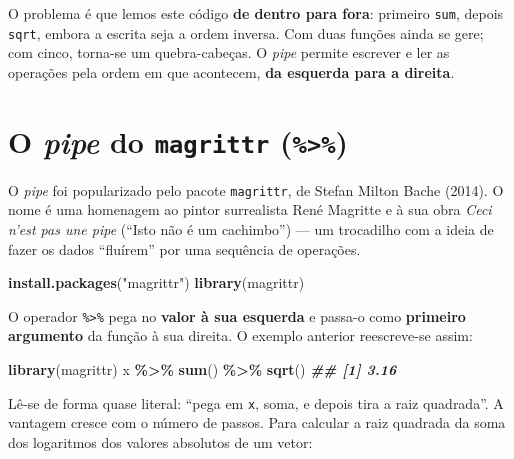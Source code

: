 \documentclass[
  portuguese,
  11pt,
  openany]{book}
\newenvironment{Shaded}{\begin{snugshade}}{\end{snugshade}}
\newcommand{\DocumentationTok}[1]{\textcolor[rgb]{0.56,0.35,0.01}{\textbf{\textit{#1}}}}
\newcommand{\FunctionTok}[1]{\textcolor[rgb]{0.13,0.29,0.53}{\textbf{#1}}}
\newcommand{\NormalTok}[1]{#1}
\newcommand{\SpecialCharTok}[1]{\textcolor[rgb]{0.81,0.36,0.00}{\textbf{#1}}}
\newcommand{\StringTok}[1]{\textcolor[rgb]{0.31,0.60,0.02}{#1}}
\begin{document}
O problema é que lemos este código \textbf{de dentro para fora}: primeiro \texttt{sum}, depois
\texttt{sqrt}, embora a escrita seja a ordem inversa. Com duas funções ainda se gere; com
cinco, torna-se um quebra-cabeças. O \emph{pipe} permite escrever e ler as operações pela
ordem em que acontecem, \textbf{da esquerda para a direita}.

\section{\texorpdfstring{O \emph{pipe} do \texttt{magrittr} (\texttt{\%\textgreater{}\%})}{O pipe do magrittr (\%\textgreater\%)}}\label{o-pipe-do-magrittr}

O \emph{pipe} foi popularizado pelo pacote \texttt{magrittr}, de Stefan Milton Bache (2014). O
nome é uma homenagem ao pintor surrealista René Magritte e à sua obra \emph{Ceci n'est pas
une pipe} (``Isto não é um cachimbo'') --- um trocadilho com a ideia de fazer os dados
``fluírem'' por uma sequência de operações.

\begin{Shaded}
\begin{Highlighting}[]
\FunctionTok{install.packages}\NormalTok{(}\StringTok{"magrittr"}\NormalTok{)}
\FunctionTok{library}\NormalTok{(magrittr)}
\end{Highlighting}
\end{Shaded}

O operador \texttt{\%\textgreater{}\%} pega no \textbf{valor à sua esquerda} e passa-o como \textbf{primeiro
argumento} da função à sua direita. O exemplo anterior reescreve-se assim:

\begin{Shaded}
\begin{Highlighting}[]
\FunctionTok{library}\NormalTok{(magrittr)}
\NormalTok{x }\SpecialCharTok{\%\textgreater{}\%} \FunctionTok{sum}\NormalTok{() }\SpecialCharTok{\%\textgreater{}\%} \FunctionTok{sqrt}\NormalTok{()}
\DocumentationTok{\#\# [1] 3.16}
\end{Highlighting}
\end{Shaded}

Lê-se de forma quase literal: ``pega em \texttt{x}, soma, e depois tira a raiz quadrada''. A
vantagem cresce com o número de passos. Para calcular a raiz quadrada da soma dos
logaritmos dos valores absolutos de um vetor:
\end{document}
